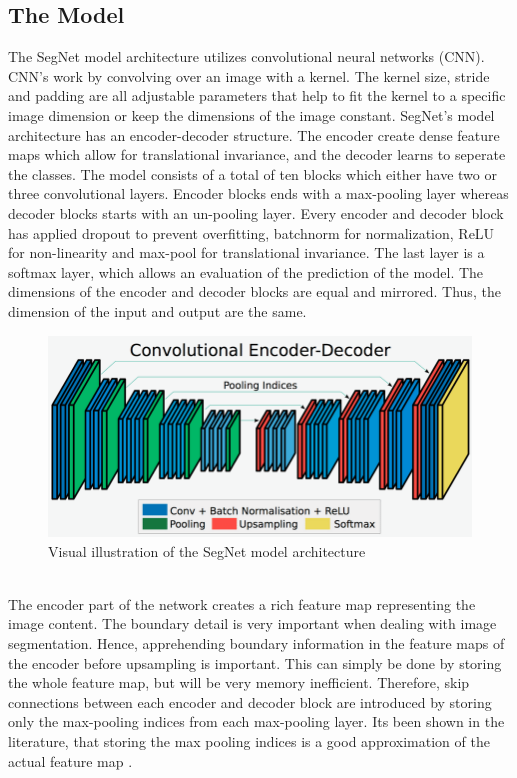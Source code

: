 \documentclass{article}
\begin{document}
\subsection{The Model}
%
The SegNet model architecture utilizes convolutional neural networks (CNN). CNN's work by convolving over an image with a kernel. The kernel size, stride and padding are all adjustable parameters that help to fit the kernel to a specific image dimension or keep the dimensions of the image constant. 
SegNet's model architecture has an encoder-decoder structure. The encoder create dense feature maps which allow for translational invariance, and the decoder learns to seperate the classes. The model consists of a total of ten blocks which either have two or three convolutional layers. Encoder blocks ends with a max-pooling layer whereas decoder blocks starts with an un-pooling layer. Every encoder and decoder block has applied dropout to prevent overfitting, batchnorm for normalization, ReLU for non-linearity and max-pool for translational invariance. The last layer is a softmax layer, which allows an evaluation of the prediction of the model. The dimensions of the encoder and decoder blocks are equal and mirrored. Thus, the dimension of the input and output are the same.
\begin{figure}[!h]
	\centering
	\includegraphics[width=0.8\linewidth]{../../poster/Encoder-Decoder2}
	\caption{Visual illustration of the SegNet model architecture}
	\label{fig:encoder-decoder2}
\end{figure}
\\
The encoder part of the network creates a rich feature map representing the image content. The boundary detail is very important when dealing with image segmentation. Hence, apprehending boundary information in the feature maps of the encoder before upsampling is important. This can simply be done by storing the whole feature map, but will be very memory inefficient. Therefore, skip connections between each encoder and decoder block are introduced by storing only the max-pooling indices from each max-pooling layer. Its been shown in the literature, that storing the max pooling indices is a good approximation of the actual feature map \cite{seg}. 
\end{document}
